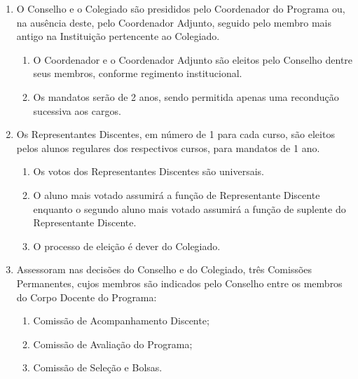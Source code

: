 \documentclass{article}
\newcommand{\grupoMenor}{Colegiado\xspace}
\newcommand{\grupoMaior}{Conselho\xspace}
\begin{document}
\begin{enumerate}
	\item O \grupoMaior e o \grupoMenor são presididos pelo Coordenador do Programa ou, na ausência deste, pelo Coordenador Adjunto, seguido pelo membro mais antigo na Instituição pertencente ao \grupoMenor.
	\begin{enumerate}
		\item O Coordenador e o Coordenador Adjunto são eleitos pelo \grupoMaior dentre seus membros, conforme regimento institucional.
		\item Os mandatos serão de 2 anos, sendo permitida apenas uma recondução sucessiva aos cargos.
	\end{enumerate}

	\item Os Representantes Discentes, em número de 1 para cada curso, são eleitos pelos alunos regulares dos respectivos cursos, para mandatos de 1 ano.
	\begin{enumerate}
		\item Os votos dos Representantes Discentes são universais.
		\item O aluno mais votado assumirá a função de Representante Discente enquanto o segundo aluno mais votado assumirá a função de suplente do Representante Discente.
		\item O processo de eleição é dever do \grupoMenor.
	\end{enumerate}	

	\item Assessoram nas decisões do \grupoMaior e do \grupoMenor, três Comissões Permanentes, cujos membros são indicados pelo \grupoMaior entre os membros do Corpo Docente do Programa:
	\begin{enumerate}[label=\Roman*]
		\item Comissão de Acompanhamento Discente;
		\item Comissão de Avaliação do Programa;
		\item Comissão de Seleção e Bolsas.
	\end{enumerate}

\end{enumerate}
\end{document}
